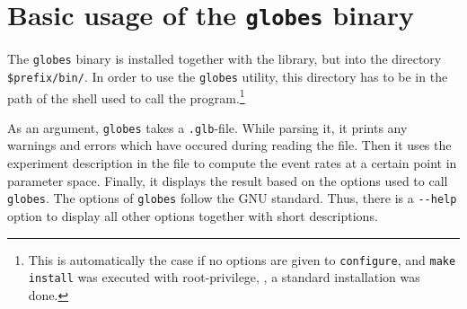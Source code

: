 \section{Basic usage of the {\tt globes} binary}
\label{sec:globes_basics}

The {\tt globes} binary is installed 
together with the library, but
into the directory {\tt \$prefix/bin/}. In order to use the {\tt globes} 
utility, this directory has to be in the path of the shell used to call the program.\footnote{This is automatically the case if
no options are given to {\tt configure}, and {\tt make install} was 
executed with root-privilege, \ie, a standard installation was done.}

As an argument, {\tt globes} takes a {\tt .glb}-file. While parsing it,
it prints any warnings and errors which have occured during reading the file. Then it uses the experiment description in the file to compute the event rates at a certain point in parameter space. Finally, it displays the result based on the options used to call {\tt globes}. 
The options of {\tt globes} follow the GNU standard. Thus, there
is a {\tt \verb+--+help} option to display all other options 
together with short descriptions.

